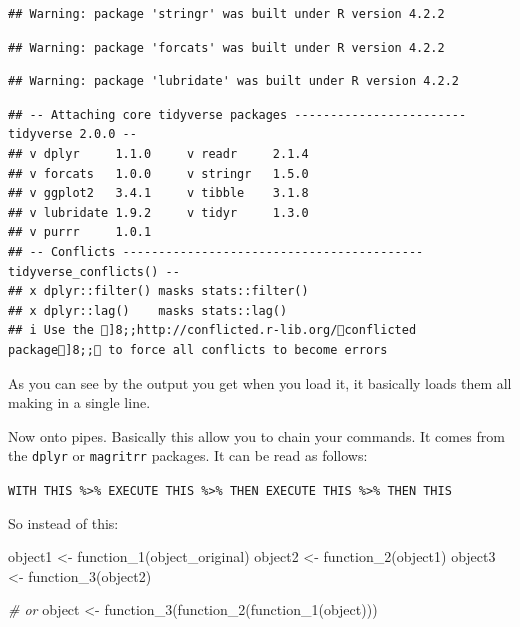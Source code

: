 \documentclass[
]{book}
\newenvironment{Shaded}{\begin{snugshade}}{\end{snugshade}}
\newcommand{\CommentTok}[1]{\textcolor[rgb]{0.56,0.35,0.01}{\textit{#1}}}
\newcommand{\FunctionTok}[1]{\textcolor[rgb]{0.00,0.00,0.00}{#1}}
\newcommand{\NormalTok}[1]{#1}
\newcommand{\OtherTok}[1]{\textcolor[rgb]{0.56,0.35,0.01}{#1}}
\begin{document}
\begin{verbatim}
## Warning: package 'stringr' was built under R version 4.2.2
\end{verbatim}

\begin{verbatim}
## Warning: package 'forcats' was built under R version 4.2.2
\end{verbatim}

\begin{verbatim}
## Warning: package 'lubridate' was built under R version 4.2.2
\end{verbatim}

\begin{verbatim}
## -- Attaching core tidyverse packages ------------------------ tidyverse 2.0.0 --
## v dplyr     1.1.0     v readr     2.1.4
## v forcats   1.0.0     v stringr   1.5.0
## v ggplot2   3.4.1     v tibble    3.1.8
## v lubridate 1.9.2     v tidyr     1.3.0
## v purrr     1.0.1     
## -- Conflicts ------------------------------------------ tidyverse_conflicts() --
## x dplyr::filter() masks stats::filter()
## x dplyr::lag()    masks stats::lag()
## i Use the ]8;;http://conflicted.r-lib.org/conflicted package]8;; to force all conflicts to become errors
\end{verbatim}

As you can see by the output you get when you load it, it basically loads them all making in a single line.

Now onto pipes.
Basically this allow you to chain your commands.
It comes from the \texttt{dplyr} or \texttt{magritrr} packages.
It can be read as follows:

\texttt{WITH\ THIS\ \%\textgreater{}\%\ EXECUTE\ THIS\ \%\textgreater{}\%\ THEN\ EXECUTE\ THIS\ \%\textgreater{}\%\ THEN\ THIS}

So instead of this:

\begin{Shaded}
\begin{Highlighting}[]
\NormalTok{object1 }\OtherTok{\textless{}{-}} \FunctionTok{function\_1}\NormalTok{(object\_original)}
\NormalTok{object2 }\OtherTok{\textless{}{-}} \FunctionTok{function\_2}\NormalTok{(object1)}
\NormalTok{object3 }\OtherTok{\textless{}{-}} \FunctionTok{function\_3}\NormalTok{(object2)}

\CommentTok{\# or}
\NormalTok{object }\OtherTok{\textless{}{-}} \FunctionTok{function\_3}\NormalTok{(}\FunctionTok{function\_2}\NormalTok{(}\FunctionTok{function\_1}\NormalTok{(object)))}
\end{Highlighting}
\end{Shaded}
\end{document}

